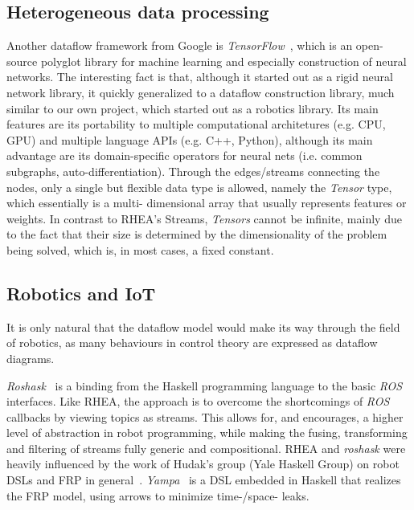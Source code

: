 \documentclass[sigplan,screen]{acmart}
\begin{document}
\subsection{Heterogeneous data processing}
Another dataflow framework from Google is
\textit{TensorFlow}~\cite{tensorflow}, which is an open-source
polyglot library for machine learning and especially construction of neural
networks.
The interesting fact is that, although it started out as a rigid neural network
library, it quickly generalized to a dataflow construction library, much similar
to our own project, which started out as a robotics library.
Its main features are its portability to multiple computational architetures
(e.g. CPU, GPU) and multiple language APIs (e.g. C++, Python), although
its main advantage are its domain-specific operators for neural nets (i.e.
common subgraphs, auto-differentiation).
Through the edges/streams connecting the nodes, only a single but flexible data
type is allowed, namely the \textit{Tensor} type, which essentially is a multi-
dimensional array that usually represents features or weights. In contrast to
\textsc{RHEA}'s Streams, \textit{Tensors} cannot be infinite, mainly due to the
fact that their size is determined by the dimensionality of the problem being
solved, which is, in most cases, a fixed constant.


\subsection{Robotics and IoT}

It is only natural that the dataflow model would make its way through the field
of robotics, as many behaviours in control theory are expressed as dataflow
diagrams.

\textit{Roshask}~\cite{roshask} is a binding from the Haskell programming language
to the basic \textit{ROS} interfaces. Like \textsc{RHEA}, the approach is to
overcome the shortcomings of \textit{ROS} callbacks by viewing topics as
streams. This allows for, and encourages, a higher level of abstraction in
robot programming, while making the fusing, transforming and filtering of
streams fully generic and compositional.
\textsc{RHEA} and \textit{roshask} were heavily influenced by the work of Hudak's
group (Yale Haskell Group) on robot DSLs and FRP in general~\cite{fran,arrows_robots,lambda_in_motion}.
\textit{Yampa}~\cite{arrows_robots} is a DSL embedded in Haskell
that realizes the FRP model, using arrows to minimize time-/space- leaks.
\end{document}
